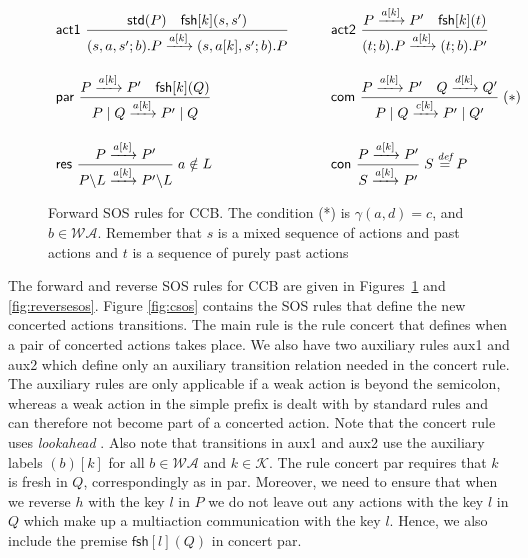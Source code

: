 \documentclass[runningheads]{llncs}
\newcommand{\Rule}[2]{\displaystyle{\frac{#1}{#2}}}
\newcommand{\paral}{\; \vert \;}
\newcommand{\mWA}{\mathcal{WA}}
\newcommand{\rom}[1]{\mbox{\rm{#1}}}
\newcommand{\std}[1]{\mathsf{std}(#1)}
\newcommand{\Keys}{\mathcal{K}}
\newcommand{\fresh}[2]{\mathsf{fsh}[#1](#2)}
\newcommand{\bydef}{\stackrel{\emph{def}}{=}}
\newcommand{\rulename}[1]{\textsf{#1}}
\begin{document}
\begin{figure}
\[
\begin{array}{ll}
\rulename{act1}\ 
\Rule
{\std{P} \quad \fresh{k}{s,s'}}
{(s,a,s';b).P \xrightarrow{a[k]}(s,a[k],s';b).P}
\qquad &
\rulename{act2}\
\Rule
{P \xrightarrow{a[k]} P' \quad \fresh{k}{t}}
{(t;b).P \xrightarrow{a[k]} (t;b).P'}
\\[25pt]
\rulename{par}\
\Rule
{P \xrightarrow{a[k]} P'\quad \fresh{k}{Q}}
{P \paral Q \xrightarrow{a[k]} P' \paral Q}
\qquad &
\rulename{com}\
\Rule
{P \xrightarrow{a[k]} P' \quad Q \xrightarrow{d[k]} Q'}
{P \paral Q \xrightarrow{c[k]} P' \paral Q'}
\; (*)
%
\\[25pt]
\rulename{res}\
\Rule
{P \xrightarrow{a[k]} P'}
{P\backslash L \xrightarrow{a[k]} P'\backslash L}
\; a \notin L
\qquad &
\rulename{con}\
\Rule
{P \xrightarrow{a[k]} P'}
{S \xrightarrow{a[k]} P'}
\; S \bydef P
\end{array}
\] 
\caption[Forward SOS rules for CCB.]{Forward SOS rules for CCB. The condition (*) is $\gamma(a,d)=c$, 
and $b \in \mathcal{WA}$. Remember that $s$ is a mixed sequence of actions and past actions and $t$ is a sequence of purely past actions} \label{fig:fsos}
\end{figure}
The forward and reverse SOS rules for CCB are given in Figures~\ref{fig:fsos} and \ref{fig:reversesos}. 
Figure \ref{fig:csos} contains the SOS rules that define the new concerted actions transitions. 
The main rule is the rule \rulename{concert} that defines when a pair of concerted actions 
takes place.  We also have two auxiliary rules \rulename{aux1} and \rulename{aux2} which 
define only an auxiliary transition relation needed in the \rulename{concert} rule. The auxiliary rules are only applicable if a weak action is beyond the semicolon, whereas a weak action in the simple prefix is dealt with by standard rules and can therefore not become part of a concerted action. Note that the \rulename{concert} rule uses \emph{lookahead} \cite{Uli92}.
Also note that transitions in \rulename{aux1} and \rulename{aux2} use the auxiliary labels $(b)[k]$ 
for all $b \in \mWA$ and $k \in \Keys$. The rule \rulename{concert par} requires that $k$ is fresh in $Q$,
correspondingly as in \rulename{par}. Moreover, we need to ensure that when we reverse $h$ with the key $l$
in $P$ we do not leave out any actions with the key $l$ in $Q$ which make up a multiaction 
communication with the key $l$. Hence, we also include the premise $\fresh{l}{Q}$ in \rulename{concert par}.
\end{document}
